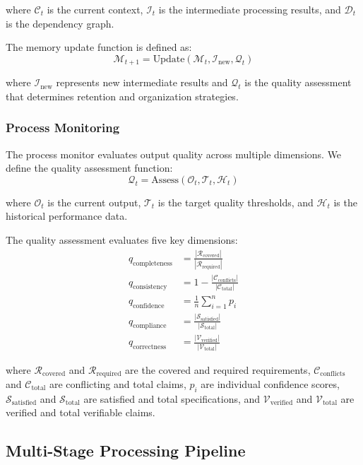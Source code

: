 \documentclass[12pt,a4paper]{article}
\begin{document}
where $\mathcal{C}_t$ is the current context, $\mathcal{I}_t$ is the intermediate processing results, and $\mathcal{D}_t$ is the dependency graph.

The memory update function is defined as:
$$\mathcal{M}_{t+1} = \text{Update}(\mathcal{M}_t, \mathcal{I}_{\text{new}}, \mathcal{Q}_t)$$

where $\mathcal{I}_{\text{new}}$ represents new intermediate results and $\mathcal{Q}_t$ is the quality assessment that determines retention and organization strategies.

\subsubsection{Process Monitoring}

The process monitor evaluates output quality across multiple dimensions. We define the quality assessment function:
$$\mathcal{Q}_t = \text{Assess}(\mathcal{O}_t, \mathcal{T}_t, \mathcal{H}_t)$$

where $\mathcal{O}_t$ is the current output, $\mathcal{T}_t$ is the target quality thresholds, and $\mathcal{H}_t$ is the historical performance data.

The quality assessment evaluates five key dimensions:
\begin{align}
q_{\text{completeness}} &= \frac{|\mathcal{R}_{\text{covered}}|}{|\mathcal{R}_{\text{required}}|} \\
q_{\text{consistency}} &= 1 - \frac{|\mathcal{C}_{\text{conflicts}}|}{|\mathcal{C}_{\text{total}}|} \\
q_{\text{confidence}} &= \frac{1}{n} \sum_{i=1}^{n} p_i \\
q_{\text{compliance}} &= \frac{|\mathcal{S}_{\text{satisfied}}|}{|\mathcal{S}_{\text{total}}|} \\
q_{\text{correctness}} &= \frac{|\mathcal{V}_{\text{verified}}|}{|\mathcal{V}_{\text{total}}|}
\end{align}

where $\mathcal{R}_{\text{covered}}$ and $\mathcal{R}_{\text{required}}$ are the covered and required requirements, $\mathcal{C}_{\text{conflicts}}$ and $\mathcal{C}_{\text{total}}$ are conflicting and total claims, $p_i$ are individual confidence scores, $\mathcal{S}_{\text{satisfied}}$ and $\mathcal{S}_{\text{total}}$ are satisfied and total specifications, and $\mathcal{V}_{\text{verified}}$ and $\mathcal{V}_{\text{total}}$ are verified and total verifiable claims.

\subsection{Multi-Stage Processing Pipeline}
\end{document}

